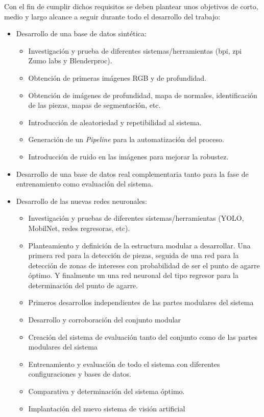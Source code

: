 Con el fin de cumplir dichos requisitos se deben plantear unos objetivos de corto, medio y largo alcance a seguir durante todo el desarrollo del trabajo:

\begin{itemize}
	\item Desarrollo de una base de datos sintética:
	\begin{itemize}
		\item Investigación y prueba de diferentes sistemas/herramientas (bpi, zpi Zumo labs y Blenderproc).
		\item Obtención de primeras imágenes RGB y de profundidad.
		\item Obtención de imágenes de profundidad, mapa de normales, identificación de las piezas, mapas de segmentación, etc.
		\item Introducción de aleatoriedad y repetibilidad al sistema.
		\item Generación de un \textit{Pipeline} para la automatización del proceso.
		\item Introducción de ruido en las imágenes para mejorar la robustez.
	\end{itemize}
	\item Desarrollo de una base de datos real complementaria tanto para la fase de entrenamiento como evaluación del sistema.
	\item Desarrollo de las nuevas redes neuronales:
	\begin{itemize}
		\item Investigación y pruebas de diferentes sistemas/herramientas (YOLO, MobilNet, redes regresoras, etc).
		\item Planteamiento y definición de la estructura modular a desarrollar. Una primera red para la detección de piezas, seguida de una red para la detección de zonas de intereses con probabilidad de ser el punto de agarre óptimo. Y finalmente un una red neuronal del tipo regresor para la determinación del punto de agarre. 
		\item Primeros desarrollos independientes de las partes modulares del sistema
		\item Desarrollo y corroboración del conjunto modular
		\item Creación del sistema de evaluación tanto del conjunto como de las partes modulares del sistema
		\item Entrenamiento y evaluación de todo el sistema con diferentes configuraciones y bases de datos.
		\item Comparativa y determinación del sistema óptimo.
		\item Implantación del nuevo sistema de visión artificial
	\end{itemize}
\end{itemize}

